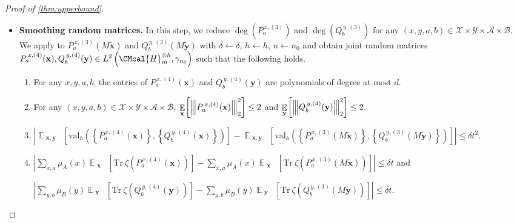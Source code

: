 \documentclass[11pt]{article}
\def\H{\CMcal{H}}
\theoremstyle{plain}
\theoremstyle{definition}
\newcommand {\minusspace} {\: \! \!}
\newcommand {\Fn} [2] {\ensuremath{ #1 \minusspace \Br{ #2 } }}
\newcommand {\set} [1] {\ensuremath{ \left\lbrace #1 \right\rbrace }}
\newcommand {\br} [1] {\ensuremath{ \left( #1 \right) }}
\newcommand {\Br} [1] {\ensuremath{ \left[ #1 \right] }}
\newcommand {\ab} [1] {\ensuremath{ \left| #1 \right| }}
\DeclareMathOperator*{\bigE}{\mathbb{E}}
\newcommand {\expec} [2] {\Fn{\bigE_{\substack{#1}}}{#2}}
\newcommand{\nnorm}[1]{{\left\vert\kern-0.25ex\left\vert\kern-0.25ex\left\vert #1
		\right\vert\kern-0.25ex\right\vert\kern-0.25ex\right\vert}}
\newcommand {\Tr} {\ensuremath{ \mathrm{Tr} }}
\newcommand {\id} {\ensuremath{\mathds{1}}}
\newcommand{\randg}{\ensuremath{\mathbf{g}}}
\newcommand{\randh}{\ensuremath{\mathbf{h}}}
\newcommand{\randx}{\ensuremath{\mathbf{x}}}
\newcommand{\randy}{\ensuremath{\mathbf{y}}}
\newcommand{\herspace}[1]{\ensuremath{\H_m^{\otimes #1}}}
\newcommand{\gval}[3]{\ensuremath{\mathrm{val}_{#1}\br{\set{#2},\set{#3}}}}
\newcommand{\fourtuples}{\ensuremath{\br{x,y,a,b}\in\calX\times\calY\times\calA\times\calB}}
\newcommand{\Pnn}[1] {\ensuremath{{P^{\,x, (#1)}_a}}}
\newcommand{\Qnn}[1] {\ensuremath{{Q^{\,y, (#1)}_b}}}
\newcommand{\calX}{\mathcal{X}}
\newcommand{\calY}{\mathcal{Y}}
\newcommand{\calA}{\mathcal{A}}
\newcommand{\calB}{\mathcal{B}}
\newcommand{\1}{\mathbb{1}} %
\begin{document}
\begin{proof}[Proof of \cref{thm:upperbound}]
\begin{itemize}
\begin{enumerate}
\item $\displaystyle\sum_{x,a}\mu_A(x)\expec{ \randx}{\Tr~\zeta\br{\Pnn{3}(M\tilde{\randx})}}\leq6\sum_{x,a}\mu_A(x)\expec{\randg}{\Tr~\zeta\br{\Pnn{2}(\randg)}}$ \quad and

$\displaystyle\sum_{y,b}\mu_B(y)\expec{ \randy}{\Tr~\zeta\br{\Qnn{3}(M\tilde{\randy})}}\leq6\sum_{y,b}\mu_B(y)\expec{\randh}{\Tr~\zeta\br{\Qnn{2}(\randh)}}.$

\item For any $x,y$, $\displaystyle\sum_{a\in\calA}\Pnn{3}(M\tilde{\randx})=\sum_{b\in\calB}\Qnn{3}(M\tilde{\randy})=\id.$
\end{enumerate}
Here $n_0=\frac{d^{O(d)}s^{12}t^{12}}{\delta^6}$. Therefore, there must exist  an $M$ such that all the above four requirements hold. We will use this fixed M throughout the rest of the proof. 

\item \textbf{Smoothing random matrices.} 
In this step, we reduce $\deg(\Pnn{3})$ and $\deg(\Qnn{3})$ for any \fourtuples. We apply \cite[Lemma 12.1]{qin2021nonlocal} to $\Pnn{3}(M\tilde{\randx})$ and $\Qnn{3}(M\tilde{\randy})$ with $\delta\gets\delta$, $h\gets h$, $n\gets n_0$ and obtain joint random matrices $\Pnn{4}(\randx),\Qnn{4}(\randy)\in L^2\br{\herspace{h},\gamma_{n_0}}$ such that the following holds.
\begin{enumerate}
\item For any $x,y,a,b$, the entries of $\Pnn{4}(\randx)$ and $\Qnn{4}(\randy)$ are polynomials of degree at most $d$.
						
\item For any \fourtuples, $\displaystyle\expec{\randx}{\nnorm{\Pnn{4}(\randx)}_2^2}\leq2$ and
$\displaystyle\expec{\randy}{\nnorm{\Qnn{4}(\randy)}_2^2}\leq2.$

\item $\displaystyle\ab{\expec{\randx,\randy}{\gval{h}{\Pnn{4}(\randx)}{\Qnn{4}(\randx)}}-\expec{\randx,\randy}{\gval{h}{\Pnn{3}(M\tilde{\randx})}{\Qnn{3}(M\tilde{\randy})}}}\leq \delta t^2.$

\item $\displaystyle\ab{\sum_{x,a}\mu_A(x)\expec{\randx}{\Tr~\zeta\br{\Pnn{4}(\randx)}}-\sum_{x,a}\mu_A(x)\expec{ \randx}{\Tr~\zeta\br{\Pnn{3}(M\tilde{\randx})}}}\leq\delta t$ \quad and

$\displaystyle\ab{\sum_{y,b}\mu_B(y)\expec{\randy}{\Tr~\zeta\br{\Qnn{4}(\randy)}}-\sum_{y,b}\mu_B(y)\expec{ \randy}{\Tr~\zeta\br{\Qnn{3}(M\tilde{\randy})}}}\leq\delta t.$


\end{enumerate}
\end{itemize}
\end{proof}
\end{document}
